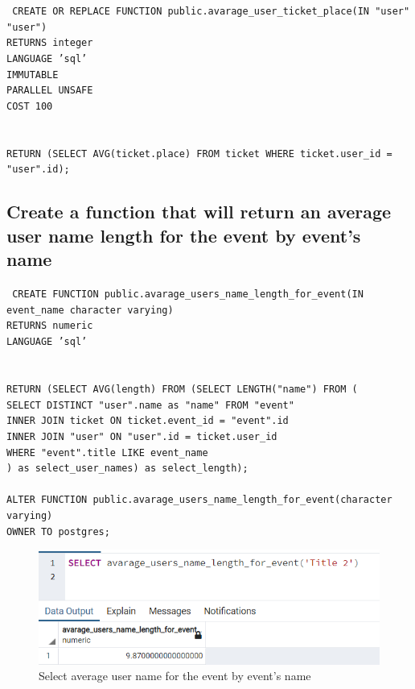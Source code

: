 \texttt{
    CREATE OR REPLACE FUNCTION public.avarage\_user\_ticket\_place(IN "user" "user") \\
    RETURNS integer \\
    LANGUAGE 'sql' \\
    IMMUTABLE \\
    PARALLEL UNSAFE \\
    COST 100 \\
    \\
    \\
    RETURN (SELECT AVG(ticket.place) FROM ticket WHERE ticket.user\_id = "user".id); \\
}

\subsection{Create a function that will return an average user name length for the event by event's name}\label{subsec:select-avarage-user-name-for-the-event-by-event's-name}

\texttt{
    CREATE FUNCTION public.avarage\_users\_name\_length\_for\_event(IN event\_name character varying) \\
    RETURNS numeric \\
    LANGUAGE 'sql' \\
    \\
    \\
    RETURN (SELECT AVG(length) FROM (SELECT LENGTH("name") FROM ( \\
    SELECT DISTINCT "user".name as "name" FROM "event" \\
    INNER JOIN ticket ON ticket.event\_id = "event".id \\
    INNER JOIN "user" ON "user".id = ticket.user\_id \\
    WHERE "event".title LIKE event\_name \\
    ) as select\_user\_names) as select\_length); \\
    \\
    ALTER FUNCTION public.avarage\_users\_name\_length\_for\_event(character varying) \\
    OWNER TO postgres; \\
}

\begin{figure}[h]
    \centering
    \includegraphics[]{images/avarage_user_name_event}
    \caption{Select average user name for the event by event's name}
    \label{fig:db_average_user_name_length}
\end{figure}

\clearpage

